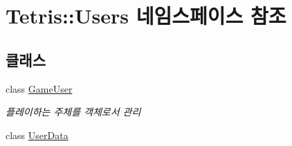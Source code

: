 \hypertarget{namespace_tetris_1_1_users}{}\section{Tetris\+:\+:Users 네임스페이스 참조}
\label{namespace_tetris_1_1_users}
\subsection*{클래스}
\begin{DoxyCompactItemize}
\item 
class \hyperlink{class_tetris_1_1_users_1_1_game_user}{Game\+User}
\begin{DoxyCompactList}\small\item\em 플레이하는 주체를 객체로서 관리 \end{DoxyCompactList}\item 
class \hyperlink{class_tetris_1_1_users_1_1_user_data}{User\+Data}
\end{DoxyCompactItemize}
